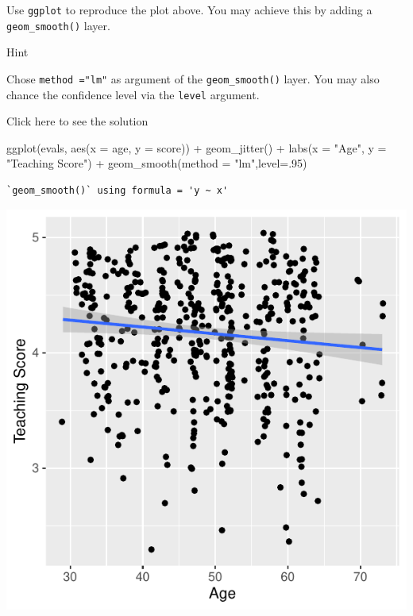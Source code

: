 \documentclass[
  letterpaper,
  DIV=11,
  numbers=noendperiod]{scrartcl}
\newenvironment{Shaded}{\begin{snugshade}}{\end{snugshade}}
\newcommand{\AttributeTok}[1]{\textcolor[rgb]{0.40,0.45,0.13}{#1}}
\newcommand{\DecValTok}[1]{\textcolor[rgb]{0.68,0.00,0.00}{#1}}
\newcommand{\FunctionTok}[1]{\textcolor[rgb]{0.28,0.35,0.67}{#1}}
\newcommand{\NormalTok}[1]{\textcolor[rgb]{0.00,0.23,0.31}{#1}}
\newcommand{\SpecialCharTok}[1]{\textcolor[rgb]{0.37,0.37,0.37}{#1}}
\newcommand{\StringTok}[1]{\textcolor[rgb]{0.13,0.47,0.30}{#1}}
\begin{document}
\begin{tcolorbox}[enhanced jigsaw, coltitle=black, bottomtitle=1mm, arc=.35mm, colframe=quarto-callout-warning-color-frame, left=2mm, opacityback=0, colback=white, title={Task 3}, toptitle=1mm, titlerule=0mm, breakable, rightrule=.15mm, bottomrule=.15mm, toprule=.15mm, colbacktitle=quarto-callout-warning-color!10!white, leftrule=.75mm, opacitybacktitle=0.6]

Use \texttt{ggplot} to reproduce the plot above. You may achieve this by
adding a \texttt{geom\_smooth()} layer.

Hint

Chose \texttt{method\ ="lm"} as argument of the \texttt{geom\_smooth()}
layer. You may also chance the confidence level via the \texttt{level}
argument.

Click here to see the solution

\begin{Shaded}
\begin{Highlighting}[]
\FunctionTok{ggplot}\NormalTok{(evals, }\FunctionTok{aes}\NormalTok{(}\AttributeTok{x =}\NormalTok{ age, }\AttributeTok{y =}\NormalTok{ score)) }\SpecialCharTok{+}
  \FunctionTok{geom\_jitter}\NormalTok{() }\SpecialCharTok{+}
  \FunctionTok{labs}\NormalTok{(}\AttributeTok{x =} \StringTok{"Age"}\NormalTok{, }\AttributeTok{y =} \StringTok{"Teaching Score"}\NormalTok{) }\SpecialCharTok{+}
 \FunctionTok{geom\_smooth}\NormalTok{(}\AttributeTok{method =} \StringTok{"lm"}\NormalTok{,}\AttributeTok{level=}\NormalTok{.}\DecValTok{95}\NormalTok{)}
\end{Highlighting}
\end{Shaded}

\begin{verbatim}
`geom_smooth()` using formula = 'y ~ x'
\end{verbatim}

\begin{center}
\includegraphics{notes_files/figure-pdf/unnamed-chunk-22-1.pdf}
\end{center}


\end{tcolorbox}
\end{document}

